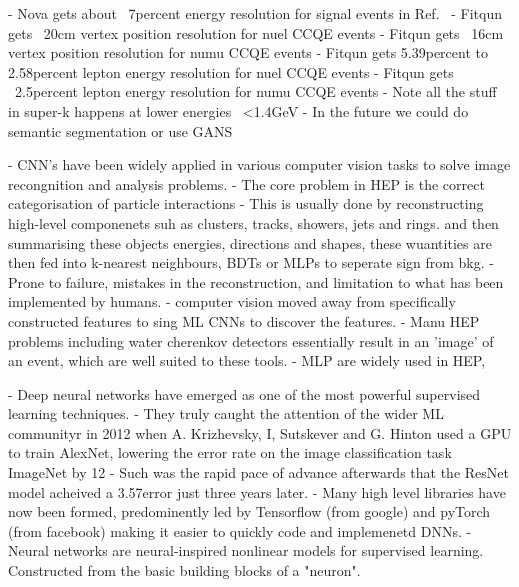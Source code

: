 - Nova gets about ~7percent energy resolution for signal events
in Ref.~\cite{jiang2019}
- Fitqun gets ~20cm vertex position resolution for nuel CCQE events
- Fitqun gets ~16cm vertex position resolution for numu CCQE events
- Fitqun gets 5.39percent to 2.58percent lepton energy resolution for nuel CCQE events
- Fitqun gets ~2.5percent lepton energy resolution for numu CCQE events
- Note all the stuff in super-k happens at lower energies ~<1.4GeV
- In the future we could do semantic segmentation or use GANS

- CNN's have been widely applied in various computer vision tasks to solve image recongnition and analysis problems.
- The core problem in HEP is the correct categorisation of particle interactions
- This is usually done by reconstructing high-level componenets suh as clusters, tracks, showers, jets and rings. and
then summarising these objects energies, directions and shapes, these wuantities are then fed into k-nearest neighbours,
BDTs or MLPs to seperate sign from bkg.
- Prone to failure, mistakes in the reconstruction, and limitation to what has been implemented by humans.
- computer vision moved away from specifically constructed features to sing ML CNNs to discover the features.
- Manu HEP problems including water cherenkov detectors essentially result in an 'image' of an event, which are well suited to these tools.
- MLP are widely used in HEP,

- Deep neural networks have emerged as one of the most powerful supervised learning techniques.
- They truly caught the attention of the wider ML communityr in 2012 when A. Krizhevsky, I, Sutskever and G. Hinton used a GPU to train
AlexNet, lowering the error rate on the image classification task ImageNet by 12%
- Such was the rapid pace of advance afterwards that the ResNet model acheived a 3.57\percent error just three years later.
- Many high level libraries have now been formed, predominently led by Tensorflow (from google) and pyTorch (from facebook) making it easier to quickly code and implemenetd DNNs.
- Neural networks are neural-inspired nonlinear models for supervised learning. Constructed from the basic building blocks of a "neuron".